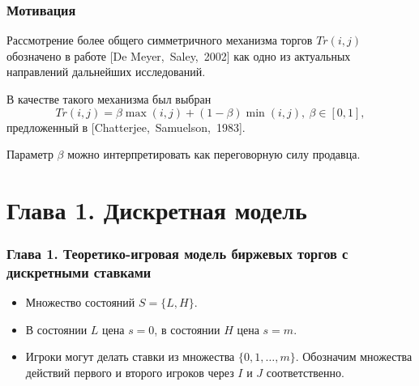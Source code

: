 \documentclass[12pt]{beamer}
\begin{document}
\begin{frame}
  \frametitle{Мотивация}
  
  Рассмотрение более общего симметричного механизма торгов $Tr(i, j)$ обозначено в работе [De Meyer,~Saley,~2002] как одно из актуальных направлений дальнейших исследований.
  
  В качестве такого механизма был выбран
  \[
    Tr(i, j) = \beta \max(i, j) + (1-\beta) \min(i, j),\ \beta \in [0, 1],
  \]
  предложенный в [Chatterjee,~Samuelson,~1983].
  
  Параметр $\beta$ можно интерпретировать как переговорную силу продавца.
\end{frame}

\section{Глава 1. Дискретная модель}

\begin{frame}
  \frametitle{Глава 1. Теоретико-игровая модель биржевых торгов с дискретными ставками}
  
  \begin{itemize}
  \item 
  Множество состояний $S = \{L, H\}$.
  \item
  В состоянии $L$ цена $s=0$, в состоянии $H$ цена $s=m$.
  \item
  Игроки могут делать ставки из множества $\{0, 1, \ldots, m\}$. Обозначим множества действий первого и второго игроков через $I$ и $J$ соответственно.
  \end{itemize}
\end{frame}
\end{document}
